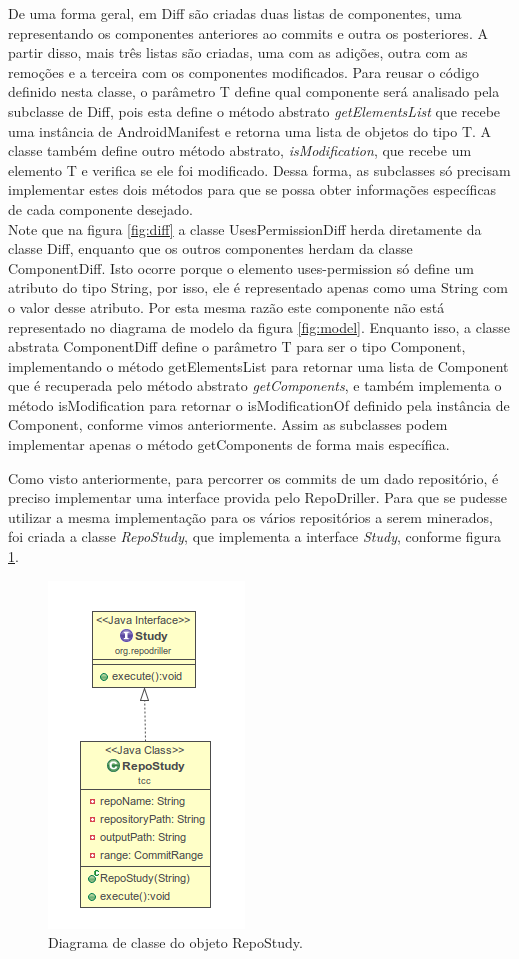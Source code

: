 \documentclass[a4paper,12pt]{article}
\begin{document}
De uma forma geral, em Diff são criadas duas listas de componentes, uma representando os componentes anteriores ao commits e outra os posteriores. A partir disso, mais três listas são criadas, uma com as adições, outra com as remoções e a terceira com os componentes modificados. Para reusar o código definido nesta classe, o parâmetro T define qual componente será analisado pela subclasse de Diff, pois esta define o método abstrato \textit{getElementsList} que recebe uma instância de AndroidManifest e retorna uma lista de objetos do tipo T. A classe também define outro método abstrato, \textit{isModification}, que recebe um elemento T e verifica se ele foi modificado. Dessa forma, as subclasses só precisam implementar estes dois métodos para que se possa obter informações específicas de cada componente desejado. \\

Note que na figura \ref{fig:diff} a classe UsesPermissionDiff herda diretamente da classe Diff, enquanto que os outros componentes herdam da classe ComponentDiff. Isto ocorre porque o elemento uses-permission só define um atributo do tipo String, por isso, ele é representado apenas como uma String com o valor desse atributo. Por esta mesma razão este componente não está representado no diagrama de modelo da figura \ref{fig:model}. Enquanto isso, a classe abstrata ComponentDiff define o parâmetro T para ser o tipo Component, implementando o método getElementsList para retornar uma lista de Component que é recuperada pelo método abstrato \textit{getComponents}, e também implementa o método isModification para retornar o isModificationOf  definido pela instância de Component, conforme vimos anteriormente. Assim as subclasses podem implementar apenas o método getComponents de forma mais específica.

Como visto anteriormente, para percorrer os commits de um dado repositório, é preciso implementar uma interface provida pelo RepoDriller. Para que se pudesse utilizar a mesma implementação para os vários repositórios a serem minerados, foi criada a classe \textit{RepoStudy}, que implementa a interface \textit{Study}, conforme figura \ref{fig:study}.

\begin{figure}[h]
\centering
\includegraphics[width=0.3\linewidth, height=0.45\linewidth]{imgs/study.png}
\caption{Diagrama de classe do objeto RepoStudy.}
\label{fig:study}
\end{figure}
\end{document}
